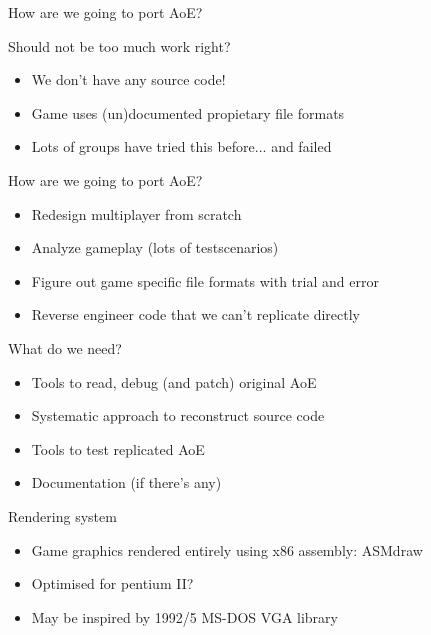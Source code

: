 \documentclass{beamer}
\begin{document}
\begin{frame}{How are we going to port AoE?}

	Should not be too much work right?

	\begin{itemize}
		\item We don't have any source code!
		\item Game uses (un)documented propietary file formats
		\item Lots of groups have tried this before... and failed
	\end{itemize}

\end{frame}


\begin{frame}{How are we going to port AoE?}

	\begin{itemize}
		\item Redesign multiplayer from scratch
		\item Analyze gameplay (lots of testscenarios)
		\item Figure out game specific file formats with trial and error
		\item Reverse engineer code that we can't replicate directly
	\end{itemize}

\end{frame}


\begin{frame}{What do we need?}
	\begin{itemize}
		\item Tools to read, debug (and patch) original AoE
		\item Systematic approach to reconstruct source code
		\item Tools to test replicated AoE
		\item Documentation (if there's any)
	\end{itemize}

\end{frame}


\begin{frame}{Rendering system}
	\begin{itemize}
		\item Game graphics rendered entirely using x86 assembly: ASMdraw
		\item Optimised for pentium II?
		\item May be inspired by 1992/5 MS-DOS VGA library
	\end{itemize}

\end{frame}
\end{document}
